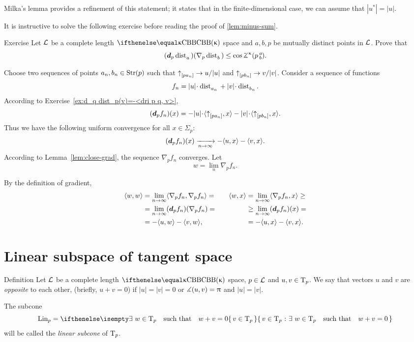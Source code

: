 Milka's lemma provides a refinement of this statement;
it states that in the finite-dimensional case, we can assume that $|u^*|= |u|$. 

It is instructive to solve the following exercise before reading the proof of \ref{lem:minus-sum}.

\begin{thm}{Exercise}\label{ex:d dist(grad)<0}
Let $\mathcal{L}$ be a complete length $\Alex\kappa$ space and $a,b,p$
be mutually distinct points in $\mathcal{L}$.
Prove that 
\[(\dd_p\distfun{a}{}{})(\nabla_p\distfun{b}{}{})
\le\cos\angk\kappa pab.\]
\end{thm}

Choose two sequences of points $a_n,b_n\in \Str(p)$ such that $\dir{p}{a_n}\to u/|u|$ and $\dir{p}{b_n}\to v/|v|$.
Consider a sequence of functions 
\[f_n=|u|\cdot\distfun{a_n}{}{}+|v|\cdot\distfun{b_n}{}{}.\]
According to Exercise~\ref{ex:d_q dist_p(v)=-<dri p q, v>}, 
\[(\dd_pf_n)(x)=-|u|\cdot\<\dir{p}{a_n},x\>-|v|\cdot\<\dir{p}{b_n},x\>.\]
Thus we have the following uniform convergence for all $x\in\Sigma_p$:
\[(\dd_pf_n)(x)\xto[n\to\infty]{}-\<u,x\>-\<v,x\>.\]
According to Lemma~\ref{lem:close-grad}, 
the sequence $\nabla_pf_n$ converges.
Let 
\[w=\lim_n\nabla_pf_n.\]

By the definition of gradient,
\[\begin{aligned}
\<w,w\>&=\lim_{n\to\infty}\<\nabla_pf_n,\nabla_pf_n\>=
&&&%
\<w,x\>&=\lim_{n\to\infty}\<\nabla_pf_n,x\>\ge
\\%
&=\lim_{n\to\infty}(\dd_p f_n)(\nabla_p f_n)
=
&&&%
&\ge
\lim_{n\to\infty}(\dd_pf_n)(x)
=
\\%
&=-\<u,w\>-\<v,w\>,
&&&%
&=-\<u,x\>-\<v,x\>.
\end{aligned}\]
\qedsf












\section{Linear subspace of tangent space}

\begin{thm}{Definition}\label{def:opp+Lin}
Let $\mathcal{L}$ be a complete length $\Alex{\kappa}$ space, $p\in \spc{L}$ and $u,v\in\T_p$.
We say that vectors $u$ and $v$ are \emph{opposite}\label{def:opposite:page} to each other, (briefly, $u+v=0$) if $|u|=|v|=0$ or $\measuredangle(u,v)=\uppi$ and $|u|=|v|$.

The subcone
\[\Lin_p=\set{v\in\T_p}{\exists\ w\in\T_p\quad \text{such that}\quad w+v=0}\]
will be called the \emph{linear subcone} of $\text{\rm T}_p$.
\end{thm}

